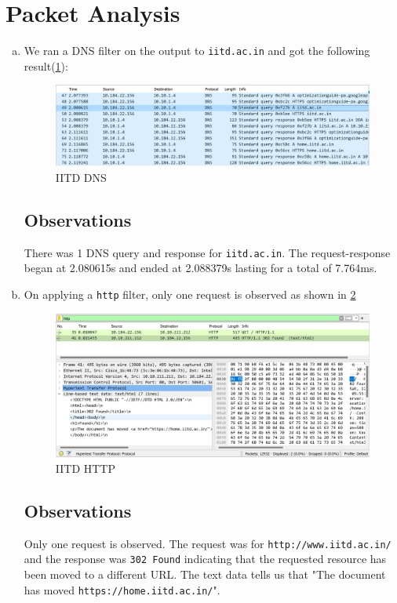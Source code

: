 \section{Packet Analysis}
\begin{enumerate}[a.]
    \item We ran a DNS filter on the output to {\tt iitd.ac.in} and got the following result(\cref{fig:IITDDNS}):
    \begin{figure}[!ht]
        \centering
        \includegraphics[scale=0.5]{images/IITD dns.png}
        \caption{IITD DNS}
        \label{fig:IITDDNS}
    \end{figure}
    \subsection*{Observations}
    There was 1 DNS query and response for {\tt iitd.ac.in}. The request-response began at 2.080615s and ended at 2.088379s lasting for a total of 7.764ms.
    
    \item On applying a {\tt http} filter, only one request is observed as shown in \cref{fig:IITDHTTP}
    \begin{figure}[!ht]
        \centering
        \includegraphics[scale=0.5]{images/IITD http.png}
        \caption{IITD HTTP}
        \label{fig:IITDHTTP}
    \end{figure}
    \subsection*{Observations}
    Only one request is observed. The request was for {\tt http://www.iitd.ac.in/} and the response was {\tt 302 Found} indicating that the requested resource has been moved to a different URL. The text data tells us that "The document has moved {\tt https://home.iitd.ac.in/}".


\end{enumerate}
